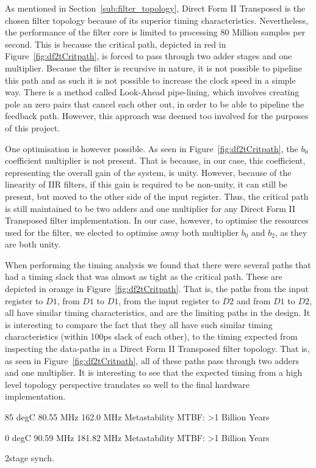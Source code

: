 \documentclass[]{article}
\begin{document}
As mentioned in Section~\ref{sub:filter_topology}, Direct Form II Transposed is the chosen filter topology because of its superior timing characteristics. Nevertheless, the performance of the filter core is limited to processing 80 Million samples per second.
This is because the critical path, depicted in red in Figure~\ref{fig:df2tCritpath}, is forced to pass through two adder stages and one multiplier.
Because the filter is recursive in nature, it is not possible to pipeline this path and as such it is not possible to increase the clock speed in a simple way. There is a method called Look-Ahead pipe-lining, which involves creating pole an zero pairs that cancel each other out, in order to be able to pipeline the feedback path.
However, this approach was deemed too involved for the purposes of this project.

One optimisation is however possible. As seen in Figure~\ref{fig:df2tCritpath}, the $b_0$ coefficient multiplier is not present. That is because, in our case, this coefficient, representing the overall gain of the system, is unity.
However, because of the linearity of IIR filters, if this gain is required to be non-unity, it can still be present, but moved to the other side of the input register.
Thus, the critical path is still maintained to be two adders and one multiplier for any Direct Form II Transposed filter implementation.
In our case, however, to optimise the resources used for the filter, we elected to optimise away both multiplier $b_0$ and $b_2$, as they are both unity.

When performing the timing analysis we found that there were several paths that had a timing slack that was almost as tight as the critical path. These are depicted in orange in Figure~\ref{fig:df2tCritpath}. That is, the paths from the input register to $D1$, from $D1$ to $D1$, from the input register to $D2$ and from $D1$ to $D2$, all have similar timing characteristics, and are the limiting paths in the design.
It is interesting to compare the fact that they all have such similar timing characteristics (within 100ps slack of each other), to the timing expected from inspecting the data-paths in a Direct Form II Transposed filter topology. That is, as seen in Figure~\ref{fig:df2tCritpath}, all of these paths pass through two adders and one multiplier.
It is interesting to see that the expected timing from a high level topology perspective translates so well to the final hardware implementation.



85 degC
80.55 MHz
162.0 MHz
Metastability MTBF: >1 Billion Years

0 degC
90.59 MHz
181.82 MHz
Metastability MTBF: >1 Billion Years

2stage synch.








\pagebreak




\end{document}
